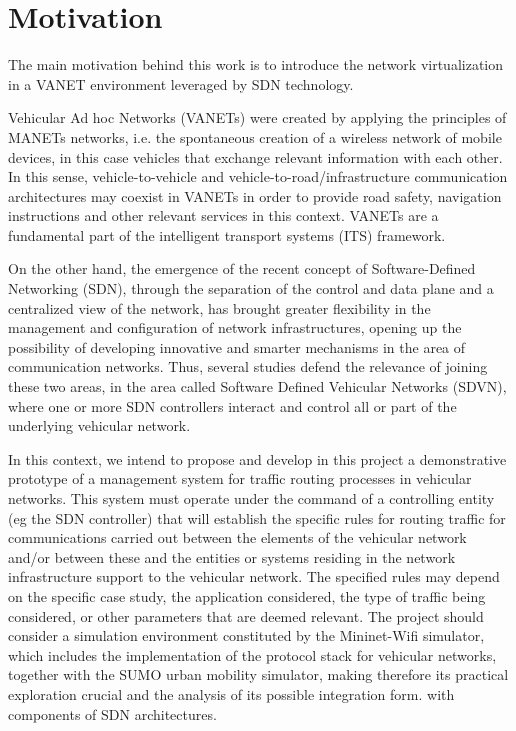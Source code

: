 \documentclass[
  oneside,
  11pt, a4paper,
  footinclude=true,
  headinclude=true,
  cleardoublepage=empty
]{scrbook}
\begin{document}
\section{Motivation}

The main motivation behind this work is to introduce the network virtualization in a VANET environment leveraged by SDN technology.
\par{Vehicular Ad hoc Networks (VANETs) were created by applying the principles of MANETs networks, i.e. the spontaneous creation of a wireless network of mobile devices, in this case vehicles that exchange relevant information with each other. In this sense, vehicle-to-vehicle and vehicle-to-road/infrastructure communication architectures may coexist in VANETs in order to provide road safety, navigation instructions and other relevant services in this context. VANETs are a fundamental part of the intelligent transport systems (ITS) framework.}
\par{
On the other hand, the emergence of the recent concept of Software-Defined Networking (SDN), through the separation of the control and data plane and a centralized view of the network, has brought greater flexibility in the management and configuration of network infrastructures, opening up the possibility of developing innovative and smarter mechanisms in the area of communication networks. Thus, several studies defend the relevance of joining these two areas, in the area called Software Defined Vehicular Networks (SDVN), where one or more SDN controllers interact and control all or part of the underlying vehicular network.}
\par{
In this context, we intend to propose and develop in this project a demonstrative prototype of a management system for traffic routing processes in vehicular networks. This system must operate under the command of a controlling entity (eg the SDN controller) that will establish the specific rules for routing traffic for communications carried out between the elements of the vehicular network and/or between these and the entities or systems residing in the network infrastructure support to the vehicular network. The specified rules may depend on the specific case study, the application considered, the type of traffic being considered, or other parameters that are deemed relevant. The project should consider a simulation environment constituted by the Mininet-Wifi simulator, which includes the implementation of the protocol stack for vehicular networks, together with the SUMO urban mobility simulator, making therefore its practical exploration crucial  and the analysis of its possible integration form. with components of SDN architectures.}
\end{document}
